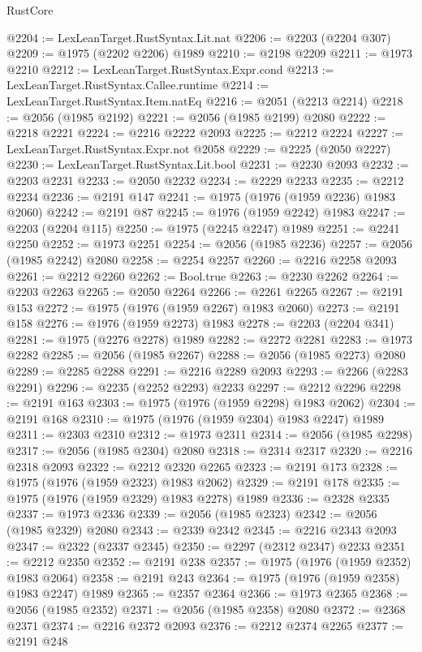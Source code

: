 \begin{lexlean}{RustCore}
\begin{coremodule}
@2204 := LexLeanTarget.RustSyntax.Lit.nat
@2206 := @2203 (@2204 @307)
@2209 := @1975 (@2202 @2206) @1989
@2210 := @2198 @2209
@2211 := @1973 @2210
@2212 := LexLeanTarget.RustSyntax.Expr.cond
@2213 := LexLeanTarget.RustSyntax.Callee.runtime
@2214 := LexLeanTarget.RustSyntax.Item.natEq
@2216 := @2051 (@2213 @2214)
@2218 := @2056 (@1985 @2192)
@2221 := @2056 (@1985 @2199) @2080
@2222 := @2218 @2221
@2224 := @2216 @2222 @2093
@2225 := @2212 @2224
@2227 := LexLeanTarget.RustSyntax.Expr.not @2058
@2229 := @2225 (@2050 @2227)
@2230 := LexLeanTarget.RustSyntax.Lit.bool
@2231 := @2230 @2093
@2232 := @2203 @2231
@2233 := @2050 @2232
@2234 := @2229 @2233
@2235 := @2212 @2234
@2236 := @2191 @147
@2241 := @1975 (@1976 (@1959 @2236) @1983 @2060)
@2242 := @2191 @87
@2245 := @1976 (@1959 @2242) @1983
@2247 := @2203 (@2204 @115)
@2250 := @1975 (@2245 @2247) @1989
@2251 := @2241 @2250
@2252 := @1973 @2251
@2254 := @2056 (@1985 @2236)
@2257 := @2056 (@1985 @2242) @2080
@2258 := @2254 @2257
@2260 := @2216 @2258 @2093
@2261 := @2212 @2260
@2262 := Bool.true
@2263 := @2230 @2262
@2264 := @2203 @2263
@2265 := @2050 @2264
@2266 := @2261 @2265
@2267 := @2191 @153
@2272 := @1975 (@1976 (@1959 @2267) @1983 @2060)
@2273 := @2191 @158
@2276 := @1976 (@1959 @2273) @1983
@2278 := @2203 (@2204 @341)
@2281 := @1975 (@2276 @2278) @1989
@2282 := @2272 @2281
@2283 := @1973 @2282
@2285 := @2056 (@1985 @2267)
@2288 := @2056 (@1985 @2273) @2080
@2289 := @2285 @2288
@2291 := @2216 @2289 @2093
@2293 := @2266 (@2283 @2291)
@2296 := @2235 (@2252 @2293) @2233
@2297 := @2212 @2296
@2298 := @2191 @163
@2303 := @1975 (@1976 (@1959 @2298) @1983 @2062)
@2304 := @2191 @168
@2310 := @1975 (@1976 (@1959 @2304) @1983 @2247) @1989
@2311 := @2303 @2310
@2312 := @1973 @2311
@2314 := @2056 (@1985 @2298)
@2317 := @2056 (@1985 @2304) @2080
@2318 := @2314 @2317
@2320 := @2216 @2318 @2093
@2322 := @2212 @2320 @2265
@2323 := @2191 @173
@2328 := @1975 (@1976 (@1959 @2323) @1983 @2062)
@2329 := @2191 @178
@2335 := @1975 (@1976 (@1959 @2329) @1983 @2278) @1989
@2336 := @2328 @2335
@2337 := @1973 @2336
@2339 := @2056 (@1985 @2323)
@2342 := @2056 (@1985 @2329) @2080
@2343 := @2339 @2342
@2345 := @2216 @2343 @2093
@2347 := @2322 (@2337 @2345)
@2350 := @2297 (@2312 @2347) @2233
@2351 := @2212 @2350
@2352 := @2191 @238
@2357 := @1975 (@1976 (@1959 @2352) @1983 @2064)
@2358 := @2191 @243
@2364 := @1975 (@1976 (@1959 @2358) @1983 @2247) @1989
@2365 := @2357 @2364
@2366 := @1973 @2365
@2368 := @2056 (@1985 @2352)
@2371 := @2056 (@1985 @2358) @2080
@2372 := @2368 @2371
@2374 := @2216 @2372 @2093
@2376 := @2212 @2374 @2265
@2377 := @2191 @248

\end{coremodule}
\end{lexlean}
